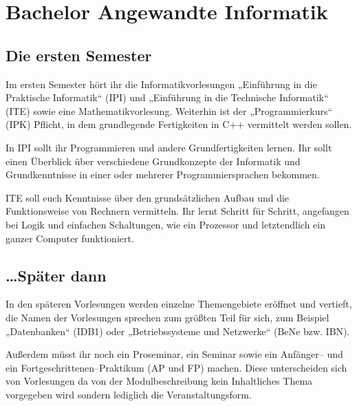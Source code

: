\section{Bachelor Angewandte Informatik}

\subsection{Die ersten Semester}

Im ersten Semester hört ihr die Informatikvorlesungen „Einführung in die Praktische Informatik“ (\gls{IPI}) und „Einführung in die Technische Informatik“ (\gls{ITE}) sowie eine Mathematikvorlesung. Weiterhin ist der „Programmierkurs“ (\gls{IPK}) Pflicht, in dem grundlegende Fertigkeiten in C++ vermittelt werden sollen.

In IPI sollt ihr Programmieren und andere Grundfertigkeiten lernen. Ihr sollt einen Überblick über verschiedene Grundkonzepte der Informatik und Grundkenntnisse in einer oder mehrerer Programmiersprachen bekommen.

ITE soll euch Kenntnisse über den grundsätzlichen Aufbau und die Funktionsweise von Rechnern vermitteln. Ihr lernt Schritt für Schritt, angefangen bei Logik und einfachen Schaltungen, wie ein Prozessor und letztendlich ein ganzer Computer funktioniert.


\subsection{\dots{}Später dann}

In den späteren Vorlesungen werden einzelne Themengebiete eröffnet und vertieft, die Namen der Vorlesungen sprechen zum größten Teil für sich, zum Beispiel „Datenbanken“ (\gls{IDB1}) oder „Betriebssysteme und Netzwerke“ (\gls{BeNe} bzw. IBN).

Außerdem müsst ihr noch ein Proseminar, ein Seminar sowie ein An\-fän\-ger-- und ein Fortgeschrittenen--Praktikum (\gls{AP} und \gls{FP}) machen. Diese unterscheiden sich von Vorlesungen da von der Modulbeschreibung kein Inhaltliches Thema vorgegeben wird sondern lediglich die Veranstaltungsform.

